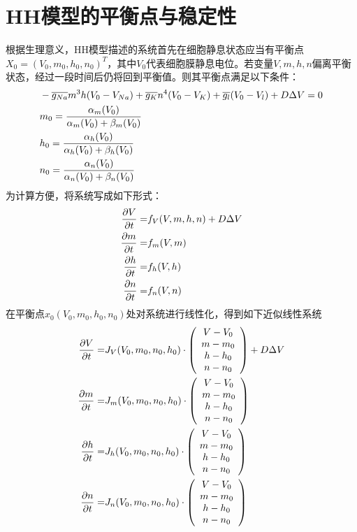 \documentclass[
    bachelor,
    nofont, %
    pdflinks,
    ]{xjtuthesis}
\begin{document}
    \section{HH模型的平衡点与稳定性}
    根据生理意义，HH模型描述的系统首先在细胞静息状态应当有平衡点$X_0=(V_0,m_0,h_0,n_0)^T$，其中$V_0$代表细胞膜静息电位。若变量$V,m,h,n$偏离平衡状态，经过一段时间后仍将回到平衡值。则其平衡点满足以下条件：
\begin{align}
\notag & -\overline{g_{Na}}m^3h(V_0 -V_{Na})+ \overline{g_{K}}n^4(V_0-V_{K})+\overline{g_{l}}(V_0-V_{l}) +D \Delta V=0 \\
& m_0 = \dfrac{\alpha_m (V_0)}{\alpha_m (V_0)+\beta_m (V_0)} \\
\notag & h_0 =\dfrac{ \alpha_h (V_0)}{ \alpha_h (V_0)+ \beta_h (V_0)} \\
\notag  & n_0= \dfrac{\alpha_n (V_0)}{\alpha_n (V_0)+\beta_n (V_0)}
\end{align}
为计算方便，将系统写成如下形式：
\begin{align}
\notag  \dfrac{\partial V}{\partial t} = & f_V(V,m,h,n)+D\Delta V\\
\dfrac{\partial m}{\partial t} = & f_m(V,m) \\
\notag \dfrac{\partial h}{\partial t} = & f_h(V,h)\\
\notag \dfrac{\partial n}{\partial t} = & f_n(V,n) 
\end{align}
在平衡点$x_0(V_{0},m_{0},h_{0},n_{0})$处对系统进行线性化，得到如下近似线性系统
\begin{align}
\notag  \dfrac{\partial V}{\partial t} = & J_{V}(V_0,m_0,n_0,h_0)\cdot
\left(
\begin{array}{c}
V-V_0\\
m-m_0\\
h-h_0\\
n-n_0
\end{array}
\right)
+D\Delta V\\
\dfrac{\partial m}{\partial t} = & J_{m}(V_0,m_0,n_0,h_0)\cdot
\left(\begin{array}{c}
V-V_0\\
m-m_0\\
h-h_0\\
n-n_0
\end{array}
\right) \\
\notag \dfrac{\partial h}{\partial t} = & J_{h}(V_0,m_0,n_0,h_0)\cdot
\left(
\begin{array}{c}
V-V_0\\
m-m_0\\
h-h_0\\
n-n_0
\end{array}
\right)\\
\notag \dfrac{\partial n}{\partial t} = & J_{n}(V_0,m_0,n_0,h_0)\cdot
\left(
\begin{array}{c}
V-V_0\\
m-m_0\\
h-h_0\\
n-n_0
\end{array}
\right)
\end{align}
\end{document}
